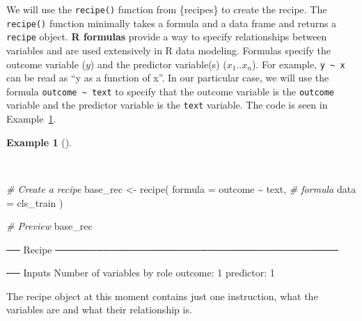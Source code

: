 \documentclass[
  letterpaper,
]{latex/krantz}
\newenvironment{Shaded}{\begin{snugshade}}{\end{snugshade}}
\newcommand{\AttributeTok}[1]{\textcolor[rgb]{0.00,0.00,0.00}{#1}}
\newcommand{\CommentTok}[1]{\textcolor[rgb]{0.00,0.00,0.00}{\textit{#1}}}
\newcommand{\FunctionTok}[1]{\textcolor[rgb]{0.00,0.00,0.00}{#1}}
\newcommand{\NormalTok}[1]{\textcolor[rgb]{0.00,0.00,0.00}{#1}}
\newcommand{\OtherTok}[1]{\textcolor[rgb]{0.00,0.00,0.00}{#1}}
\newcommand{\SpecialCharTok}[1]{\textcolor[rgb]{0.00,0.00,0.00}{#1}}
\theoremstyle{definition}
\newtheorem{example}{Example}[chapter]
\theoremstyle{remark}
\begin{document}
We will use the \texttt{recipe()} function from \{recipes\} to create
the recipe. The \texttt{recipe()} function minimally takes a formula and
a data frame and returns a \texttt{recipe} object. \textbf{R formulas}
provide a way to specify relationships between variables and are used
extensively in R data modeling. Formulas specify the outcome variable
(\(y\)) and the predictor variable(s) (\(x_1 .. x_n\)). For example,
\texttt{y\ \textasciitilde{}\ x} can be read as ``y as a function of
x''. In our particular case, we will use the formula
\texttt{outcome\ \textasciitilde{}\ text} to specify that the outcome
variable is the \texttt{outcome} variable and the predictor variable is
the \texttt{text} variable. The code is seen in
Example~\ref{exm-predict-class-recipe}.

\begin{example}[]\protect\hypertarget{exm-predict-class-recipe}{}\label{exm-predict-class-recipe}

~

\begin{Shaded}
\begin{Highlighting}[]
\CommentTok{\# Create a recipe}
\NormalTok{base\_rec }\OtherTok{\textless{}{-}}
  \FunctionTok{recipe}\NormalTok{(}
    \AttributeTok{formula =}\NormalTok{ outcome }\SpecialCharTok{\textasciitilde{}}\NormalTok{ text, }\CommentTok{\# formula}
    \AttributeTok{data =}\NormalTok{ cls\_train}
\NormalTok{    )}

\CommentTok{\# Preview}
\NormalTok{base\_rec}
\end{Highlighting}
\end{Shaded}

\begin{Shaded}
\begin{Highlighting}[]
\NormalTok{── Recipe ─────────────────────────────────────────}

\NormalTok{── Inputs}
\NormalTok{Number of variables by role}
\NormalTok{outcome:   1}
\NormalTok{predictor: 1}
\end{Highlighting}
\end{Shaded}

\end{example}

The recipe object at this moment contains just one instruction, what the
variables are and what their relationship is.
\end{document}
